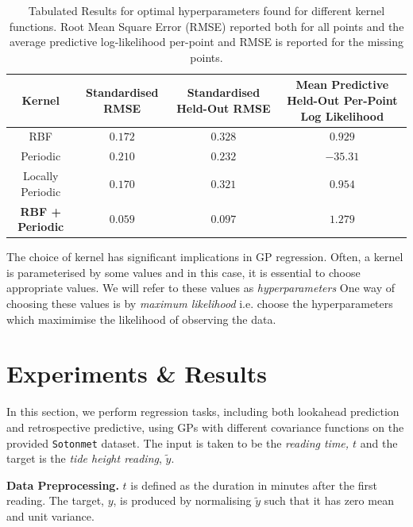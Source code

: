 \documentclass[a4paper, twocolumn, 10pt]{article}
\begin{document}
\begin{table}[ht]
	\centering
	\begin{tabular}{@{}cccc@{}}
		\toprule
		\textbf{Kernel} & \textbf{Standardised RMSE} & \textbf{Standardised Held-Out RMSE} & \textbf{Mean Predictive Held-Out Per-Point Log Likelihood} \\ \midrule
		RBF & $0.172$ & $0.328$ & $0.929$ \\
		Periodic & $0.210$ & $0.232$ & $-35.31$ \\
		Locally Periodic & $0.170$ & $0.321$ & $0.954$ \\
		\textbf{RBF + Periodic} & \textbf{$0.059$} & \textbf{$0.097$} & \textbf{$1.279$} \\ \bottomrule
	\end{tabular}
	\caption{\label{tab}Tabulated Results for optimal hyperparameters found for different kernel functions. Root Mean Square Error (RMSE) reported both for all points and the average predictive log-likelihood per-point and RMSE is reported for the missing points.}
\end{table}

The choice of kernel has significant implications in GP regression. Often, a kernel is parameterised by some values and in this case, it is essential to choose appropriate values. We will refer to these values as \emph{hyperparameters} One way of choosing these values is by \emph{maximum likelihood} i.e. choose the hyperparameters which maximimise the likelihood of observing the data. 

\section{Experiments \& Results}
In this section, we perform regression tasks, including both lookahead prediction and retrospective predictive, using GPs with different covariance functions on the provided \texttt{Sotonmet} dataset. The input is taken to be the \emph{reading time, $t$} and the target is the \emph{tide height reading}, $\tilde{y}$.

\noindent\textbf{Data Preprocessing.} $t$ is defined as the duration in minutes after the first reading. The target, $y$, is produced by normalising $\tilde{y}$ such that it has zero mean and unit variance. 
\end{document}
